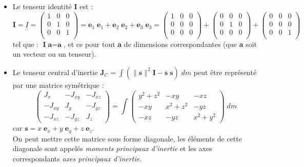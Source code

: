 \documentclass[a4paper]{article}
\begin{document}
\begin{itemize}
\item Le tenseur identité \textbf{I} est : 
\[ \textbf{I} = \underline{\underline{I}} = \begin{pmatrix} 1 & 0 & 0 \\ 0 & 1 & 0 \\ 0 & 0 & 1 \\ \end{pmatrix} = \textbf{e}_1 \; \textbf{e}_1 + \textbf{e}_2 \; \textbf{e}_2 + \textbf{e}_3 \; \textbf{e}_3 = \begin{pmatrix} 1 & 0 & 0 \\ 0 & 0 & 0 \\ 0 & 0 & 0 \\ \end{pmatrix} + \begin{pmatrix} 0 & 0 & 0 \\ 0 & 1 & 0 \\ 0 & 0 & 0 \\ \end{pmatrix} + \begin{pmatrix} 0 & 0 & 0 \\ 0 & 0 & 0 \\ 0 & 0 & 1 \\ \end{pmatrix} \]
tel que : $\displaystyle \textbf{I} \; \textbf{a} = \textbf{a} $, et ce pour tout \textbf{a} de dimensions correspondantes (que \textbf{a} soit un vecteur ou un tenseur).





\item Le tenseur central d'inertie $\displaystyle \textbf{J}_C = \int (\| \textbf{s} \|^2 \textbf{I} - \textbf{s} \; \textbf{s}) \; d m $ peut être représenté par une matrice symétrique : 
\[ \begin{pmatrix} J_x & - J_{x y} & - J_{x z} \\ - J_{x y} & J_{y} & - J_{y z} \\ - J_{x z} & - J_{y z} & J_{z} \end{pmatrix} = \int \begin{pmatrix} y^2 + z^2 & - x y & - x z \\ - x y & x^2 + z^2 & - y z \\ - x z & - y z & x^2 + y^2 \end{pmatrix} \; d m \]
car $ \textbf{s} = x \; \textbf{e}_x  + y \; \textbf{e}_y + z \; \textbf{e}_z $. \\
On peut mettre cette matrice sous forme diagonale, les éléments de cette diagonale sont appelés \emph{moments principaux d'inertie} et les axes correspondants \emph{axes principaux d'inertie}.






\end{itemize}
\end{document}
